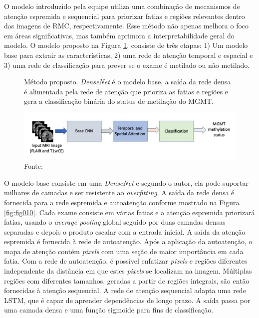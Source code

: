 O modelo introduzido pela equipe utiliza uma combinação de mecanismos de atenção espremida e sequencial para priorizar fatias e regiões relevantes dentro das imagens de \gls{RMC}, respectivamente. Esse método não apenas melhora o foco em áreas significativas, mas também aprimora a interpretabilidade geral do modelo. O modelo proposto na Figura \ref{fig:fig009}, consiste de três etapas: 1) Um modelo base para extrair as características, 2) uma rede de atenção temporal e espacial e 3) uma rede de classificação para prever se o exame é metilado ou não metilado.
\newline

\begin{figure}[htbp]
    \centering
    \caption{Método proposto. \textit{DenseNet} é o modelo base, a saída da rede densa é alimentada pela rede de atenção que prioriza as fatias e regiões e gera a classificação binária do status de metilação do MGMT.
    }
    \includegraphics[width=1\textwidth]{figures/fig009.png}
    \caption*{Fonte: \cite{iranmehrImprovedPredictionMGMT2022}}
    \label{fig:fig009}
\end{figure}

O modelo base consiste em uma \textit{DenseNet} e segundo o autor, ela pode suportar milhares de camadas e ser resistente ao \textit{overfitting}. A saída da rede densa é fornecida para a rede espremida e autoatenção conforme mostrado na Figura \ref{fig:fig010}. Cada exame consiste em várias fatias e a atenção espremida priorizará fatias, usando o \textit{average pooling} global seguido por duas camadas densas separadas e depois o produto escalar com a entrada inicial. A saída da atenção espremida é fornecida à rede de autoatenção. Após a aplicação da autoatenção, o mapa de atenção contém \textit{pixels} com uma seção de maior importância em cada fatia. Com a rede de autoatenção, é possível enfatizar \textit{pixels} e regiões diferentes independente da distância em que estes \textit{pixels} se localizam na imagem. Múltiplas regiões com diferentes tamanhos, geradas a partir de regiões integrais, são então fornecidas à atenção sequencial. A rede de atenção sequencial adapta uma rede \gls{LSTM}, que é capaz de aprender dependências de longo prazo. A saída passa por uma camada densa e uma função sigmoide para fins de classificação.

